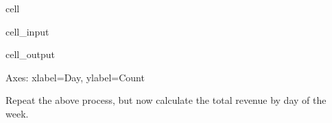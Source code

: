 \documentclass[letterpaper,10pt,english]{sphinxmanual}
\begin{document}
\begin{sphinxuseclass}{cell}
\begin{sphinxuseclass}{cell_input}
\begin{sphinxVerbatim}[commandchars=\\\{\}]
  
\end{sphinxVerbatim}

\end{sphinxuseclass}
\begin{sphinxuseclass}{cell_output}
\begin{sphinxVerbatim}[commandchars=\\\{\}]
\PYGZlt{}Axes: xlabel=\PYGZsq{}Day\PYGZsq{}, ylabel=\PYGZsq{}Count\PYGZsq{}\PYGZgt{}
\end{sphinxVerbatim}

\noindent{}

\end{sphinxuseclass}
\end{sphinxuseclass}
\sphinxAtStartPar
{}

\sphinxAtStartPar
Repeat the above process, but now calculate the total revenue by day of the week.
\end{document}
